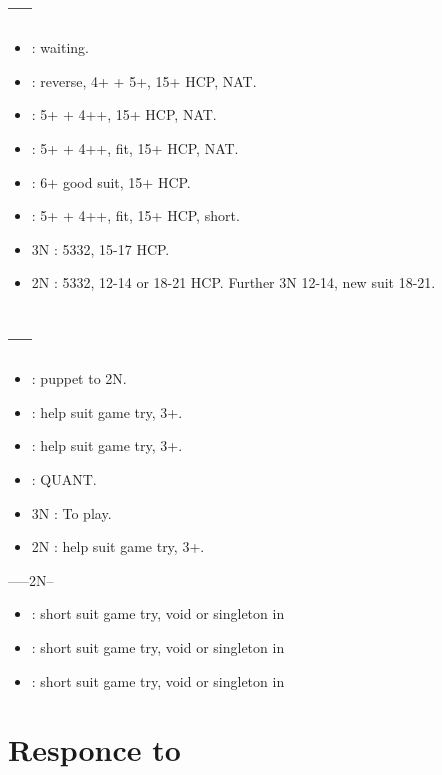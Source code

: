 \documentclass[12pt,twoside,a5paper]{report}%
\begin{document}
	\section*{----}
	\begin{itemize}
	\renewcommand{\labelitemi}{}
	\item {} : waiting.
	\item {} : reverse, 4+\sp{} + 5+\he{}, 15+ HCP, NAT.
	\item {} : 5+\he{} + 4+\cl{}+, 15+ HCP, NAT.
	\item {} : 5+\he{} + 4+\di{}+, fit, 15+ HCP, NAT.
	\item {} : 6+\he{} good suit, 15+ HCP.
	\item {} : 5+\he{} + 4+\di{}+, fit, 15+ HCP, short\sp{}.
	\item 3N : 5332, 15-17 HCP.
	\item 2N : 5332, 12-14 or 18-21 HCP. Further 3N 12-14, new suit 18-21.
	\end{itemize}

	\section*{----}
	\begin{itemize}
	\renewcommand{\labelitemi}{} 
	\item {} : puppet to 2N.
	\item {} : help suit game try, 3+\cl{}.
	\item {} : help suit game try, 3+\di{}.
	\item {} : QUANT.
	\item 3N : To play.
	\item 2N : help suit game try, 3+\sp{}. 
	\end{itemize}

	------2N--
	\begin{itemize}
	\renewcommand{\labelitemi}{}
	\item {} : short suit game try, void or singleton in \cl{}
	\item {} : short suit game try, void or singleton in \di{}
	\item {} : short suit game try, void or singleton in \sp{}
	\end{itemize}

	\chapter*{Responce to }
	
\end{document}
